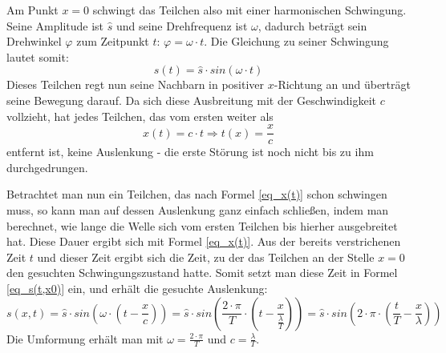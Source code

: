 Am Punkt \(x = 0\) schwingt das Teilchen also mit einer harmonischen Schwingung. Seine Amplitude ist \(\hat{s}\) und seine Drehfrequenz ist \(\omega\), dadurch beträgt sein Drehwinkel \(\varphi\) zum Zeitpunkt \(t\):  \(\varphi = \omega \cdot t\).  Die Gleichung zu seiner Schwingung lautet somit:
\begin{equation}
 	s(t) = \hat{s} \cdot sin(\omega \cdot t)
		\label{eq_s(t,x0)}
\end{equation}
Dieses Teilchen regt nun seine Nachbarn in positiver \(x\)-Richtung an und überträgt seine Bewegung darauf. Da sich diese Ausbreitung mit der Geschwindigkeit \(c\) vollzieht, hat jedes Teilchen, das vom ersten weiter als
\begin{equation}
 	x(t) = c \cdot t \Rightarrow t(x) = \frac{x}{c}
		\label{eq_x(t)}
\end{equation}
entfernt ist, keine Auslenkung - die erste Störung ist noch nicht bis zu ihm durchgedrungen.

Betrachtet man nun ein Teilchen, das nach Formel \ref{eq_x(t)} schon schwingen muss, so kann man auf dessen Auslenkung ganz einfach schließen, indem man berechnet, wie lange die Welle sich vom ersten Teilchen bis hierher ausgebreitet hat. Diese Dauer ergibt sich mit Formel \ref{eq_x(t)}. Aus der bereits verstrichenen Zeit \(t\) und dieser Zeit ergibt sich die Zeit, zu der das Teilchen an der Stelle \(x = 0\) den gesuchten Schwingungszustand hatte. Somit setzt man diese Zeit in Formel \ref{eq_s(t,x0)} ein, und erhält die gesuchte Auslenkung:
\begin{equation}
	s(x,t) = \hat{s} \cdot sin\left(\omega \cdot \left(t - \frac{x}{c}\right)\right) = \hat{s} \cdot sin\left(\frac{2 \cdot \pi}{T} \cdot \left(t - \frac{x}{\frac{\lambda}{T}}\right)\right) = \hat{s} \cdot sin\left(2 \cdot \pi \cdot \left(\frac{t}{T} - \frac{x}{\lambda}\right)\right)
		\label{eq_s(x,t)}
\end{equation}
Die Umformung erhält man mit \(\omega = \frac{2 \cdot \pi}{T}\) und \(c = \frac{\lambda}{T}\).

